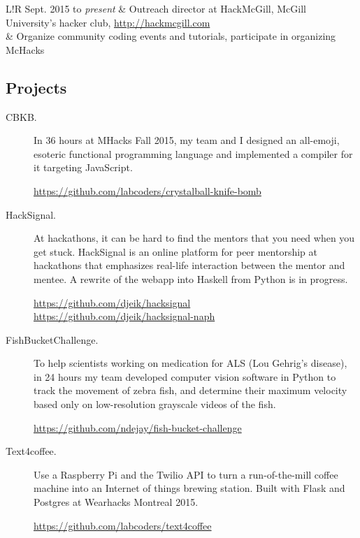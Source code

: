 \documentclass{article}
\newcommand\VRule{\color{lightgray}\vrule width 0.5pt}
\begin{document}
\begin{tabular}[h]{L!{\VRule}R}
    Sept. 2015 to \emph{present}
        & Outreach director at HackMcGill, McGill University's hacker club,
            \url{http://hackmcgill.com} \\
        & Organize community coding events and tutorials, participate in organizing McHacks
\end{tabular}

\subsection*{Projects}

\begin{description}
    \item[CBKB.] In 36 hours at MHacks Fall 2015, my team and I designed an
        all-emoji, esoteric functional programming language and implemented
        a compiler for it targeting JavaScript.

        \url{https://github.com/labcoders/crystalball-knife-bomb}

    \item[HackSignal.] At hackathons, it can be hard to find the mentors that
        you need when you get stuck. HackSignal is an online platform for peer
        mentorship at hackathons that emphasizes real-life interaction between
        the mentor and mentee. A rewrite of the webapp into Haskell from Python
        is in progress.

        \url{https://github.com/djeik/hacksignal}~
        \url{https://github.com/djeik/hacksignal-naph}

    \item[FishBucketChallenge.] To help scientists working on medication for
        ALS (Lou Gehrig's disease), in 24 hours my team developed computer
        vision software in Python to track the movement of zebra fish, and
        determine their maximum velocity based only on low-resolution grayscale
        videos of the fish.

        \url{https://github.com/ndejay/fish-bucket-challenge}

    \item[Text4coffee.] Use a Raspberry Pi and the Twilio API to turn a
        run-of-the-mill coffee machine into an Internet of things brewing
        station. Built with Flask and Postgres at Wearhacks Montreal 2015.

        \url{https://github.com/labcoders/text4coffee}


\end{description}
\end{document}
